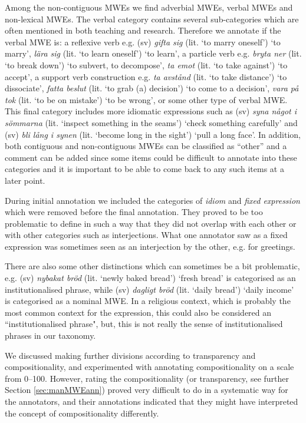 \documentclass[output=paper,colorlinks,citecolor=brown]{langscibook}
\begin{document}
Among the non-contiguous MWEs we find adverbial MWEs, verbal MWEs and non-lexical MWEs. 
The verbal category contains several sub-categories which are often mentioned in both teaching and research. Therefore we annotate if the verbal MWE is: a reflexive verb 
e.g. (sv) \textit{gifta sig} 
(lit. `to marry oneself') `to marry', \textit{lära sig} 
(lit. `to learn oneself') `to learn', a particle verb
e.g. \textit{bryta ner}  
(lit. `to break down') `to subvert, to decompose', \textit{ta emot}
(lit. `to take against') `to accept', a support verb construction  
e.g. \textit{ta avstånd} 
(lit. `to take distance') `to dissociate', \textit{fatta beslut}
(lit. `to grab (a) decision') `to come to a decision', \textit{vara på tok}
(lit. `to be on mistake') `to be wrong', or some other type of verbal MWE. This final category includes more idiomatic expressions such as (sv) \textit{syna något i sömmarna}
(lit. `inspect something in the seams') `check something carefully' and (sv) \textit{bli lång i synen}
(lit. `become long in the sight') `pull a long face'.
In addition, both contiguous and non-contiguous MWEs can be classified as “other” and a comment can be added 
since  
some items could be difficult to annotate into these categories and 
it is important to be able to come back to any such items at a later point.
 
During initial annotation we included the categories of \textit{idiom} and \textit{fixed expression} which were removed before the final annotation. They proved to be too problematic to define in such a way that they did not overlap with each other or with other categories such as interjections. What one annotator saw as a fixed expression was sometimes seen as an interjection by the other, e.g. for greetings. 

There are also some other distinctions which can sometimes be a bit problematic, e.g. (sv) \textit{nybakat bröd} 
(lit. `newly baked bread') `fresh bread' is categorised as an institutionalised phrase, while (sv) \textit{dagligt bröd}
(lit. `daily bread') `daily income' is categorised as a nominal MWE. In a religious context, which is probably the most common context for the expression, this could also be considered an ``institutionalised phrase", but, this is not really the sense of institutionalised phrases in our taxonomy.

We discussed making further divisions according to transparency and compositionality, and experimented with annotating compositionality on a scale from 0--100. However, rating the compositionality (or transparency, see further Section \ref{sec:manMWEann}) proved very difficult to do in a systematic way for the annotators, and their annotations indicated that they might have interpreted the concept of compositionality differently.
\end{document}
